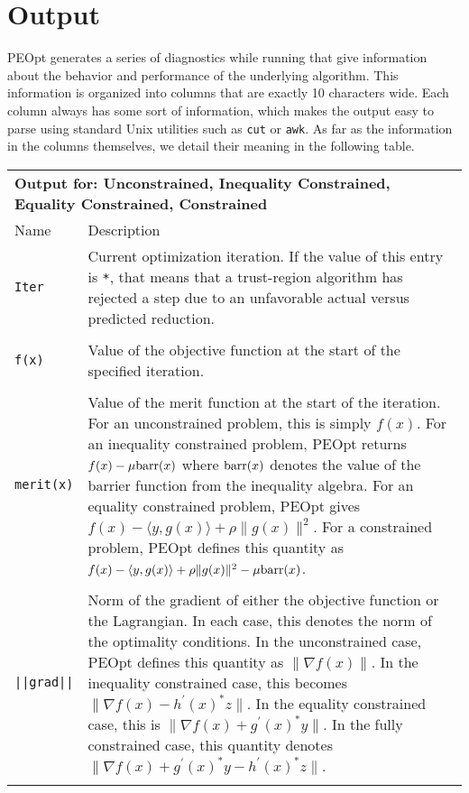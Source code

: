 \documentclass{report}
\newcommand{\ineqGradLag}[2]{\nabla f(#1)-h^\prime(#1)^*#2}
\newcommand{\eqGradLag}[2]{\nabla f(#1)+g^\prime(#1)^*#2}
\newcommand{\conGradLag}[3]{\nabla f(#1)+g^\prime(#1)^*#2-h^\prime(#1)^*#3}
\begin{document}
\chapter{Output}\label{ch:Output}

        PEOpt generates a series of diagnostics while running that give information about the behavior and performance of the underlying algorithm.  This information is organized into columns that are exactly 10 characters wide.  Each column always has some sort of information, which makes the output easy to parse using standard Unix utilities such as \texttt{cut} or \texttt{awk}.  As far as the information in the columns themselves, we detail their meaning in the following table.

\begin{longtable}{lp{}}
\multicolumn{2}{p{\textwidth}}{\bf Output for: Unconstrained, Inequality Constrained, Equality Constrained, Constrained}\\
Name & Description\\
\texttt{Iter} & Current optimization iteration.  If the value of this entry is \texttt{*}, that means that a trust-region algorithm has rejected a step due to an unfavorable actual versus predicted reduction. \\
\\
\texttt{f(x)} & Value of the objective function at the start of the specified iteration.\\
\\
\texttt{merit(x)} & Value of the merit function at the start of the iteration.  For an unconstrained problem, this is simply $f(x)$.  For an inequality constrained problem, PEOpt returns $f(x)-\mu \textnormal{barr}(x)$ where $\textnormal{barr}(x)$ denotes the value of the barrier function from the inequality algebra.  For an equality constrained problem, PEOpt gives $f(x)-\langle y, g(x)\rangle + \rho \|g(x)\|^2$.  For a constrained problem, PEOpt defines this quantity as $f(x)-\langle y, g(x)\rangle + \rho \|g(x)\|^2 - \mu\textnormal{barr}(x)$.\\
\\
\texttt{||grad||} & Norm of the gradient of either the objective function or the Lagrangian.  In each case, this denotes the norm of the optimality conditions.  In the unconstrained case, PEOpt defines this quantity as $\|\nabla f(x)\|$.  In the inequality constrained case, this becomes $\|\ineqGradLag{x}{z}\|$.  In the equality constrained case, this is $\|\eqGradLag{x}{y}\|$.  In the fully constrained case, this quantity denotes $\|\conGradLag{x}{y}{z}\|$.\\\\

\end{longtable}
\end{document}
